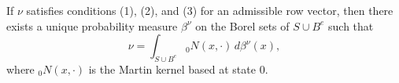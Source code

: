 If $\nu$ satisfies conditions (1), (2), and (3) for an admissible row vector, then there exists a unique probability measure $\beta^\nu$ on the Borel sets of $S \cup B^e$ such that
$$\nu = \int_{S \cup B^e} {}_0N(x, \cdot) \, d\beta^\nu(x),$$
where ${}_0N(x, \cdot)$ is the Martin kernel based at state $0$.
